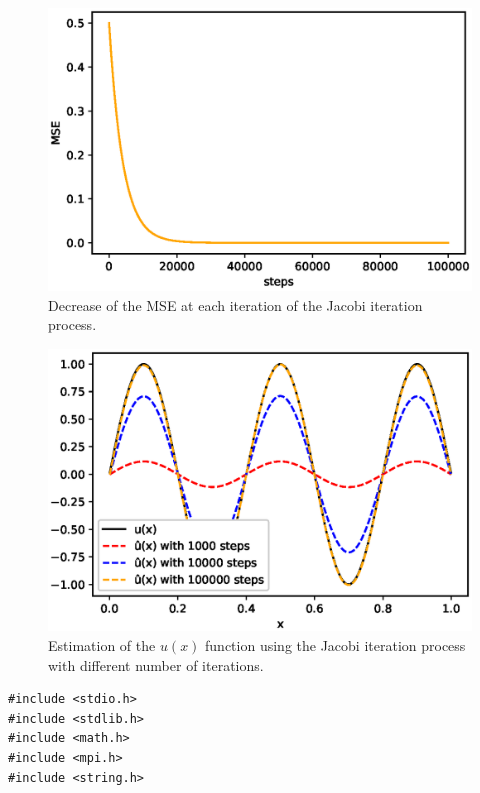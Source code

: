 \documentclass{article}
\begin{document}
\begin{enumerate}
\begin{figure}[H]
  \centering
  \includegraphics[scale=0.5]{MSE_dec}
  \caption{Decrease of the MSE at each iteration of the Jacobi iteration process.}
  \label{fig:MSE_dec}
\end{figure}

\begin{figure}[H]
  \centering
  \includegraphics[scale=0.5]{func_appr}
  \caption{Estimation of the $u(x)$ function using the Jacobi iteration process with different number of iterations.}
  \label{fig:func_appr}
\end{figure}

\begin{lstlisting}[style=customc, caption={MPI implementation of an ODE solver using Jacobi iteration process}, label={lst:ode_jacobi}]
#include <stdio.h>
#include <stdlib.h>
#include <math.h>
#include <mpi.h>
#include <string.h>


\end{lstlisting}
\end{enumerate}
\end{document}
